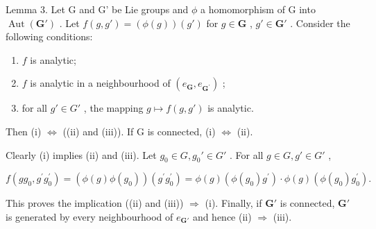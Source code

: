 Lemma 3. Let G and G' be Lie groups and \(\phi\) a homomorphism of G into \(\operatorname{Aut}(\mathbf{G}')\) . Let \(f(g, g') = (\phi(g))(g')\) for \(g \in \mathbf{G}\) , \(g' \in \mathbf{G}'\) . Consider the following conditions:

\begin{enumerate}
\def\labelenumi{(\roman{enumi})}
\item
  \(f\) is analytic;
\item
  \(f\) is analytic in a neighbourhood of \((e_{\mathbf{G}}, e_{\mathbf{G}^{\prime}})\) ;
\item
  for all \(g' \in G'\) , the mapping \(g \mapsto f(g, g')\) is analytic.
\end{enumerate}

Then (i) \(\Leftrightarrow\) ((ii) and (iii)). If G is connected, (i) \(\Leftrightarrow\) (ii).

Clearly (i) implies (ii) and (iii). Let \(g_0 \in G, g_0' \in G'\) . For all \(g \in G, g' \in G'\) ,

\[
f \left(g g _ {0}, g ^ {\prime} g _ {0} ^ {\prime}\right) = (\phi (g) \phi (g _ {0})) \left(g ^ {\prime} g _ {0} ^ {\prime}\right) = \phi (g) \left(\phi (g _ {0}) g ^ {\prime}\right)\cdot \phi (g) \left(\phi (g _ {0}) g _ {0} ^ {\prime}\right).
\]

This proves the implication ((ii) and (iii)) \(\Rightarrow\) (i). Finally, if \(\mathbf{G}'\) is connected, \(\mathbf{G}'\) is generated by every neighbourhood of \(e_{\mathbf{G}'}\) and hence (ii) \(\Rightarrow\) (iii).


